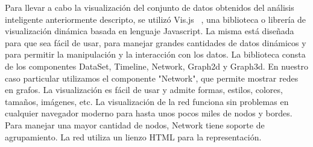 
Para llevar a cabo la visualización del conjunto de datos obtenidos del análisis inteligente anteriormente descripto, se utilizó Vis.js ~\cite{ref_visjs}, una biblioteca o librería de visualización dinámica basada en lenguaje Javascript. La misma está diseñada para que sea fácil de usar, para manejar grandes cantidades de datos dinámicos y para permitir la manipulación y la interacción con los datos. La biblioteca consta de los componentes DataSet, Timeline, Network, Graph2d y Graph3d.
En nuestro caso particular utilizamos el componente "Network", que permite mostrar redes en grafos. La visualización es fácil de usar y admite formas, estilos, colores, tamaños, imágenes, etc. La visualización de la red funciona sin problemas en cualquier navegador moderno para hasta unos pocos miles de nodos y bordes. Para manejar una mayor cantidad de nodos, Network tiene soporte de agrupamiento. La red utiliza un lienzo HTML para la representación.